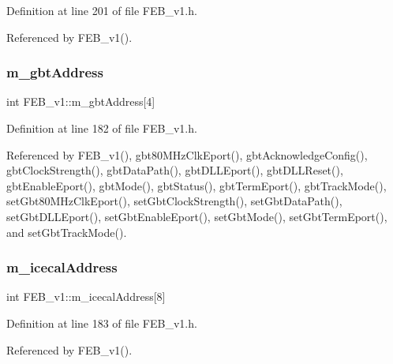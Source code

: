 Definition at line 201 of file F\+E\+B\+\_\+v1.\+h.



Referenced by F\+E\+B\+\_\+v1().

\mbox{\label{classFEB__v1_ac625855df976f16694178f1a4c0eef1e}} 
\subsubsection{\texorpdfstring{m\+\_\+gbt\+Address}{m\_gbtAddress}}
{\footnotesize\ttfamily int F\+E\+B\+\_\+v1\+::m\+\_\+gbt\+Address\mbox{[}4\mbox{]}\hspace{0.3cm}{\ttfamily [private]}}



Definition at line 182 of file F\+E\+B\+\_\+v1.\+h.



Referenced by F\+E\+B\+\_\+v1(), gbt80\+M\+Hz\+Clk\+Eport(), gbt\+Acknowledge\+Config(), gbt\+Clock\+Strength(), gbt\+Data\+Path(), gbt\+D\+L\+L\+Eport(), gbt\+D\+L\+L\+Reset(), gbt\+Enable\+Eport(), gbt\+Mode(), gbt\+Status(), gbt\+Term\+Eport(), gbt\+Track\+Mode(), set\+Gbt80\+M\+Hz\+Clk\+Eport(), set\+Gbt\+Clock\+Strength(), set\+Gbt\+Data\+Path(), set\+Gbt\+D\+L\+L\+Eport(), set\+Gbt\+Enable\+Eport(), set\+Gbt\+Mode(), set\+Gbt\+Term\+Eport(), and set\+Gbt\+Track\+Mode().

\mbox{\label{classFEB__v1_adf21041831669e75283dd2a88fbaddf5}} 
\subsubsection{\texorpdfstring{m\+\_\+icecal\+Address}{m\_icecalAddress}}
{\footnotesize\ttfamily int F\+E\+B\+\_\+v1\+::m\+\_\+icecal\+Address\mbox{[}8\mbox{]}\hspace{0.3cm}{\ttfamily [private]}}



Definition at line 183 of file F\+E\+B\+\_\+v1.\+h.



Referenced by F\+E\+B\+\_\+v1().

